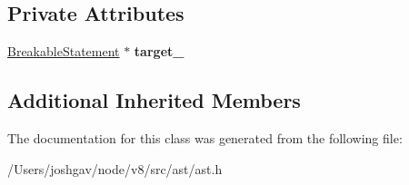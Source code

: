 \subsection*{Private Attributes}
\begin{DoxyCompactItemize}
\item 
\hyperlink{classv8_1_1internal_1_1_breakable_statement}{Breakable\+Statement} $\ast$ {\bfseries target\+\_\+}\hypertarget{classv8_1_1internal_1_1_break_statement_abcbc5bc8c5ccde83fa88f39b0b68d097}{}\label{classv8_1_1internal_1_1_break_statement_abcbc5bc8c5ccde83fa88f39b0b68d097}

\end{DoxyCompactItemize}
\subsection*{Additional Inherited Members}


The documentation for this class was generated from the following file\+:\begin{DoxyCompactItemize}
\item 
/\+Users/joshgav/node/v8/src/ast/ast.\+h\end{DoxyCompactItemize}
